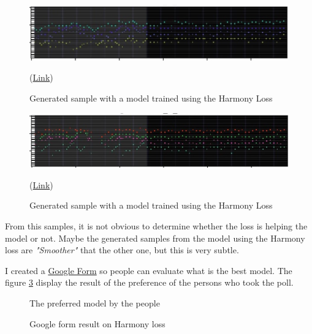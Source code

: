 \documentclass[12pt]{report}
\begin{document}
\begin{figure}
    \centering
    \includegraphics[width=\textwidth]{images/experiences/harmony-rnn/with-harmony.jpg}
    \caption{Generated sample with a model trained using the Harmony Loss}
    (\href{https://github.com/ValentinVignal/midiGenerator/blob/master/samples/harmony-comparison/generated_with_harmony.mid}{Link})
    \label{fig:exp:harmony:with}
\end{figure}
\begin{figure}
    \centering
    \includegraphics[width=\textwidth]{images/experiences/harmony-rnn/without-harmony.jpg}
    \caption{Generated sample with a model trained using the Harmony Loss}
    (\href{https://github.com/ValentinVignal/midiGenerator/blob/master/samples/harmony-comparison/generated_without_harmony.mid}{Link})
    \label{fig:exp:harmony:without}
\end{figure}

From this samples, it is not obvious to determine whether the loss is helping the model or not.
Maybe the generated samples from the model using the Harmony loss are \textit{"Smoother"} that the other one, but this is very subtle.


I created a \href{https://docs.google.com/forms/d/e/1FAIpQLScZ1ZAkCxwIRiuewNlDUFgZcpEY2O-Yg0T8IEQzp4k9_BCCJg/viewform?usp=sf_link}{Google Form} so people can evaluate what is the best model.
The figure \ref{fig:pie:harmony} display the result of the preference of the persons who took the poll.

\begin{figure}
    \begin{center}
    \caption{Google form result on Harmony loss}
    The preferred model by the people
    \label{fig:pie:harmony}
    \end{center}
\end{figure}
\end{document}
